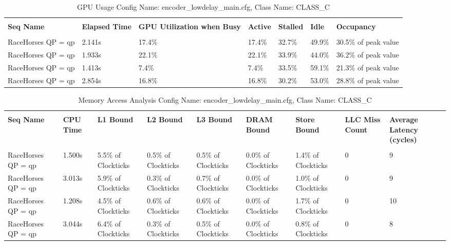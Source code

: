 \documentclass{article}%
\begin{document}
\newpage%
\begin{longtabu}{| X[l] | X[l] | X[l] | X[l] | X[l] | X[l] | X[l] |}%
\caption{%
GPU Usage\newline%
 Config Name: encoder\_lowdelay\_main.cfg,\newline%
 Class Name: CLASS\_C\newline%
%
}%
\hline%
&&&&&&\\%
\textbf{Seq Name}&\textbf{Elapsed Time}&\textbf{GPU Utilization when Busy}&\textbf{Active}&\textbf{Stalled}&\textbf{Idle}&\textbf{Occupancy}\\%
&&&&&&\\%
\hline%
\endhead%
RaceHorses\newline%
 QP = qp&2.141s&17.4\%&17.4\%&32.7\%&49.9\%&30.5\% of peak value\\%
\hline%
RaceHorses\newline%
 QP = qp&1.933s&22.1\%&22.1\%&33.9\%&44.0\%&36.2\% of peak value\\%
\hline%
RaceHorses\newline%
 QP = qp&1.413s&7.4\%&7.4\%&33.5\%&59.1\%&21.3\% of peak value\\%
\hline%
RaceHorses\newline%
 QP = qp&2.854s&16.8\%&16.8\%&30.2\%&53.0\%&28.8\% of peak value\\%
\hline%
\end{longtabu}%
\begin{longtabu}{| X[l] | X[l] | X[l] | X[l] | X[l] | X[l] | X[l] | X[l] | X[l] |}%
\caption{%
Memory Access Analysis\newline%
 Config Name: encoder\_lowdelay\_main.cfg,\newline%
 Class Name: CLASS\_C\newline%
%
}%
\hline%
&&&&&&&&\\%
\textbf{Seq Name}&\textbf{CPU Time}&\textbf{L1 Bound}&\textbf{L2 Bound}&\textbf{L3 Bound}&\textbf{DRAM Bound}&\textbf{Store Bound}&\textbf{LLC Miss Count}&\textbf{Average Latency (cycles)}\\%
&&&&&&&&\\%
\hline%
\endhead%
RaceHorses\newline%
 QP = qp&1.500s&5.5\% of Clockticks&0.5\% of Clockticks&0.5\% of Clockticks&0.0\% of Clockticks&1.4\% of Clockticks&0&9\\%
\hline%
RaceHorses\newline%
 QP = qp&3.013s&5.9\% of Clockticks&0.3\% of Clockticks&0.7\% of Clockticks&0.0\% of Clockticks&1.0\% of Clockticks&0&9\\%
\hline%
RaceHorses\newline%
 QP = qp&1.208s&4.5\% of Clockticks&0.6\% of Clockticks&0.6\% of Clockticks&0.0\% of Clockticks&1.7\% of Clockticks&0&10\\%
\hline%
RaceHorses\newline%
 QP = qp&3.044s&6.4\% of Clockticks&0.3\% of Clockticks&0.5\% of Clockticks&0.0\% of Clockticks&0.8\% of Clockticks&0&8\\%
\hline%
\end{longtabu}%
\end{document}
